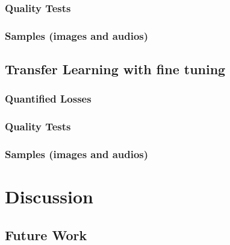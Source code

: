 \documentclass{book}
\begin{document}
    \subsection{Quality Tests}
    \subsection{Samples (images and audios)}
  \section{Transfer Learning with fine tuning}
    \subsection{Quantified Losses}
    \subsection{Quality Tests}
    \subsection{Samples (images and audios)}

\chapter{Discussion}
  \section{Future Work}



\end{document}
